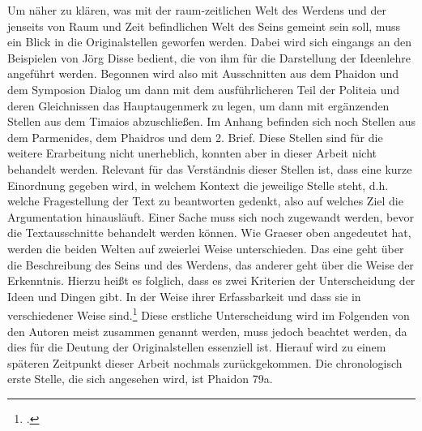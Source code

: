 Um näher zu klären, was mit der raum-zeitlichen Welt des Werdens und der jenseits von Raum und Zeit befindlichen Welt des Seins gemeint sein soll, muss ein Blick in die Originalstellen geworfen werden. Dabei wird sich eingangs an den Beispielen von Jörg Disse bedient, die von ihm für die Darstellung der Ideenlehre angeführt werden. Begonnen wird also mit Ausschnitten aus dem Phaidon und dem Symposion Dialog um dann mit dem ausführlicheren Teil der Politeia und deren Gleichnissen das Hauptaugenmerk zu legen, um dann mit ergänzenden Stellen aus dem Timaios abzuschließen. 
Im Anhang befinden sich noch Stellen aus dem Parmenides, dem Phaidros und dem 2. Brief. Diese Stellen sind für die weitere Erarbeitung nicht unerheblich, konnten aber in dieser Arbeit nicht behandelt werden.
Relevant für das Verständnis dieser Stellen ist, dass eine kurze Einordnung gegeben wird, in welchem Kontext die jeweilige Stelle steht, d.h. welche Fragestellung der Text zu beantworten gedenkt, also auf welches Ziel die Argumentation hinausläuft.
Einer Sache muss sich noch zugewandt werden, bevor die Textausschnitte behandelt werden können. Wie Graeser oben angedeutet hat, werden die beiden Welten auf zweierlei Weise unterschieden. Das eine geht über die Beschreibung des Seins und des Werdens, das anderer geht über die Weise der Erkenntnis. Hierzu heißt es folglich, dass es zwei Kriterien der Unterscheidung der Ideen und Dingen gibt. In der Weise ihrer Erfassbarkeit und dass sie in verschiedener Weise sind.\footcite[vgl.][S. 40]{Martin73}
Diese erstliche Unterscheidung wird im Folgenden von den Autoren meist zusammen genannt werden, muss jedoch beachtet werden, da dies für die Deutung der Originalstellen essenziell ist. Hierauf wird zu einem späteren Zeitpunkt dieser Arbeit nochmals zurückgekommen. Die chronologisch erste Stelle, die sich angesehen wird, ist Phaidon 79a.
